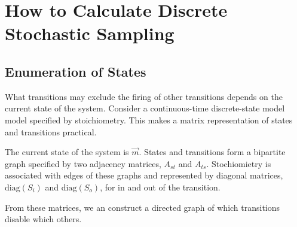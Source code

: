 \documentclass{article}
\begin{document}
\section{How to Calculate Discrete Stochastic Sampling}
\subsection{Enumeration of States}
What transitions may exclude the firing of other
transitions depends on the current state of the
system. Consider a continuous-time discrete-state
model model specified by stoichiometry. This makes
a matrix representation of states and transitions
practical.

The current state of the system is $\vec{m}$.
States and transitions form a bipartite graph
specified by two adjacency matrices, $A_{st}$ and
$A_{ts}$. Stochiomietry is associated with edges
of these graphs and represented by diagonal
matrices, $\mbox{diag}(S_i)$ and $\mbox{diag}(S_o)$,
for in and out of the transition.

From these matrices, we an construct a directed
graph of which transitions disable which others.
\end{document}
